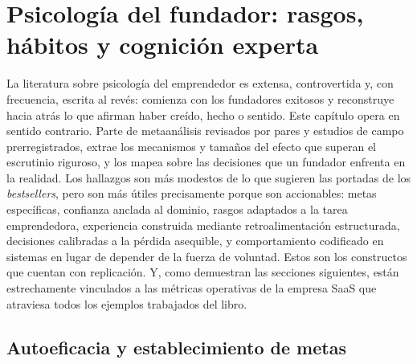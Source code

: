 \chapter{Psicología del fundador: rasgos, hábitos y cognición experta}\label{ch:founder-psychology}


La literatura sobre psicología del emprendedor es extensa, controvertida y, con frecuencia,
escrita al revés: comienza con los fundadores exitosos y reconstruye hacia atrás lo que afirman
haber creído, hecho o sentido. Este capítulo opera en sentido contrario. Parte de metaanálisis
revisados por pares y estudios de campo prerre\-gis\-tra\-dos, extrae los mecanismos y tamaños
del efecto que superan el escrutinio riguroso, y los mapea sobre las decisiones que un fundador
enfrenta en la realidad. Los hallazgos son más modestos de lo que sugieren las portadas de los
\emph{bestsellers}, pero son más útiles precisamente porque son accionables: metas específicas,
confianza anclada al dominio, rasgos adaptados a la tarea emprendedora, experiencia construida
mediante retroalimentación estructurada, decisiones calibradas a la pérdida asequible, y
comportamiento codificado en sistemas en lugar de depender de la fuerza de voluntad. Estos son
los constructos que cuentan con replicación. Y, como demuestran las secciones siguientes,
están estrechamente vinculados a las métricas operativas de la empresa SaaS que atraviesa
todos los ejemplos trabajados del libro.

\section{Autoeficacia y establecimiento de metas}\label{sec:self-efficacy-goals}

